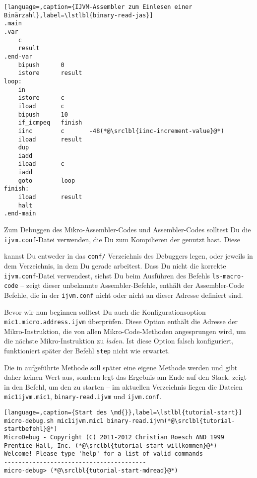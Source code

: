 \begin{lstlisting}[language=,caption={IJVM-Assembler zum Einlesen einer Binärzahl},label=\lstlbl{binary-read-jas}]
.main
.var
    c
    result
.end-var
    bipush      0
    istore      result
loop:
    in
    istore      c
    iload       c
    bipush      10
    if_icmpeq   finish
    iinc        c       -48(*@\srclbl{iinc-increment-value}@*)
    iload       result
    dup
    iadd
    iload       c
    iadd
    goto        loop
finish:
    iload       result
    halt
.end-main
\end{lstlisting}

Zum Debuggen des Mikro-Assembler-Codes und Assembler-Codes solltest Du die \texttt{ijvm.conf}-Datei verwenden, die Du zum Kompilieren der  genutzt hast. Diese \date{conf} kannst Du entweder in das \texttt{conf/} Verzeichnis des Debuggers legen, oder jeweils in dem Verzeichnis, in dem Du gerade arbeitest. Dass Du nicht die korrekte \texttt{ijvm.conf}-Datei verwendest, siehst Du beim Ausführen des Befehls \texttt{ls-macro-code} -- zeigt dieser unbekannte Assembler-Befehle, enthält der Assembler-Code Befehle, die in der \texttt{ijvm.conf} nicht oder nicht an dieser Adresse definiert sind.

Bevor wir nun beginnen solltest Du auch die Konfigurationsoption \texttt{mic1.micro.address.ijvm} überprüfen. Diese Option enthält die Adresse der Mikro-Instruktion, die von allen Mikro-Code-Methoden angesprungen wird, um die nächste Mikro-Instruktion zu \emph{laden}. Ist diese Option falsch konfiguriert, funktioniert später der Befehl \texttt{step} nicht wie erwartet.

Die in  aufgeführte Methode soll später eine eigene Methode werden und gibt daher keinen Wert aus, sondern legt das Ergebnis am Ende auf den Stack.  zeigt in  den Befehl, um den \md{} zu starten -- im aktuellen Verzeichnis liegen die Dateien \texttt{mic1ijvm.mic1}, \texttt{binary-read.ijvm} und \texttt{ijvm.conf}.

\begin{lstlisting}[language=,caption={Start des \md{}},label=\lstlbl{tutorial-start}]
micro-debug.sh mic1ijvm.mic1 binary-read.ijvm(*@\srclbl{tutorial-startbefehl}@*)
MicroDebug - Copyright (C) 2011-2012 Christian Roesch AND 1999 Prentice-Hall, Inc. (*@\srclbl{tutorial-start-willkommen}@*)
Welcome! Please type 'help' for a list of valid commands
----------------------------------------
micro-debug> (*@\srclbl{tutorial-start-mdread}@*)
\end{lstlisting}

